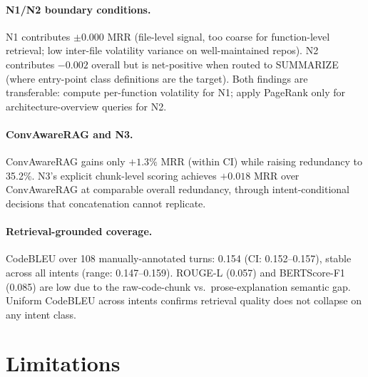 \documentclass[runningheads]{llncs}
\begin{document}
\paragraph{N1/N2 boundary conditions.}
N1 contributes $\pm$0.000 MRR (file-level signal, too coarse for
function-level retrieval; low inter-file volatility variance on well-maintained
repos). N2 contributes $-0.002$ overall but is net-positive when routed to
SUMMARIZE (where entry-point class definitions are the target). Both findings
are transferable: compute per-function volatility for N1; apply PageRank only
for architecture-overview queries for N2.

\paragraph{ConvAwareRAG and N3.}
ConvAwareRAG gains only $+1.3\%$ MRR (within CI) while raising redundancy
to 35.2\%. N3's explicit chunk-level scoring achieves $+0.018$ MRR over
ConvAwareRAG at comparable overall redundancy, through intent-conditional
decisions that concatenation cannot replicate.

\paragraph{Retrieval-grounded coverage.}
CodeBLEU over 108 manually-annotated turns: 0.154 (CI: 0.152--0.157),
stable across all intents (range: 0.147--0.159). ROUGE-L (0.057) and
BERTScore-F1 (0.085) are low due to the raw-code-chunk vs.\ prose-explanation
semantic gap. Uniform CodeBLEU across intents confirms retrieval quality
does not collapse on any intent class.

\section{Limitations}
\label{sec:limitations}
\end{document}
